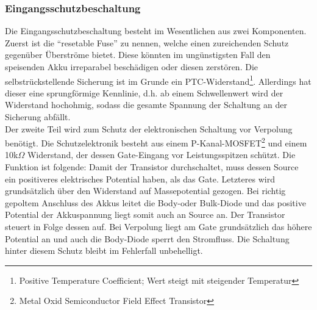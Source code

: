 \documentclass[12pt]{scrreprt} %
\begin{document}
\subsubsection{Eingangsschutzbeschaltung}
Die Eingangsschutzbeschaltung besteht im Wesentlichen aus zwei Komponenten. Zuerst ist die "`resetable Fuse"' zu nennen, welche einen zureichenden Schutz gegenüber Überströme bietet. Diese könnten im ungünstigsten Fall den speisenden Akku irreparabel beschädigen oder diesen zerstören. Die selbstrückstellende Sicherung ist im Grunde ein PTC-Widerstand\footnote{Positive Temperature Coefficient; Wert steigt mit steigender Temperatur}. Allerdings hat dieser eine sprungförmige Kennlinie, d.h. ab einem Schwellenwert wird der Widerstand hochohmig, sodass die gesamte Spannung der Schaltung an der Sicherung abfällt.\\
Der zweite Teil wird zum Schutz der elektronischen Schaltung vor Verpolung benötigt. Die Schutzelektronik besteht aus einem P-Kanal-MOSFET\footnote{Metal Oxid Semiconductor Field Effect Transistor} und einem 10k$\Omega$ Widerstand, der dessen Gate-Eingang vor Leistungsspitzen schützt. Die Funktion ist folgende: Damit der Transistor durchschaltet, muss dessen Source ein positiveres elektrisches Potential haben, als das Gate. Letzteres wird grundsätzlich über den Widerstand auf Massepotential gezogen. Bei richtig gepoltem Anschluss des Akkus leitet die Body-oder Bulk-Diode und das positive Potential der Akkuspannung liegt somit auch an Source an. Der Transistor steuert in Folge dessen auf. Bei Verpolung liegt am Gate grundsätzlich das höhere Potential an und auch die Body-Diode sperrt den Stromfluss. Die Schaltung hinter diesem Schutz bleibt im Fehlerfall unbehelligt. 
\end{document}
